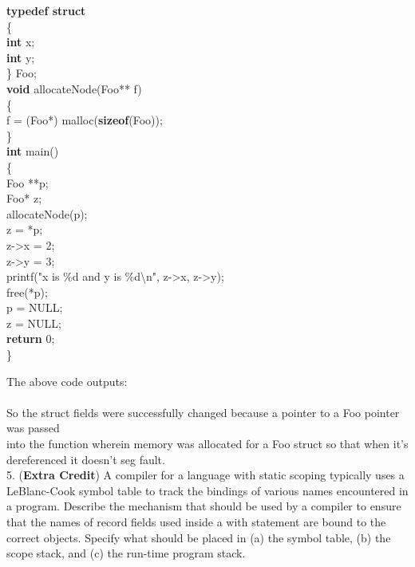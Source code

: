 \documentclass[12pt]{article}
\begin{document}
\begin{flushleft}
{\selectfont 

\qquad \qquad \textbf{typedef struct}\\ 
\qquad \qquad \{\\
\qquad \qquad \qquad \textbf{int} x;\\
\qquad \qquad \qquad \textbf{int} y;\\
\qquad \qquad \} Foo;\\
[2mm]
\qquad \qquad \textbf{void} allocateNode(Foo** f)\\
\qquad \qquad \{\\
\qquad \qquad \qquad *f = (Foo*) malloc(\textbf{sizeof}(Foo));\\
\qquad \qquad \}\\
[2mm]
\qquad \qquad \textbf{int} main()\\
\qquad \qquad \{\\
\qquad \qquad \qquad Foo **p;\\
\qquad \qquad \qquad Foo* z;\\
[2mm]	
\qquad \qquad \qquad allocateNode(p);\\
[2mm]
\qquad \qquad \qquad z = *p;\\
\qquad \qquad \qquad z->x = 2;\\
\qquad \qquad \qquad z->y = 3;\\
[2mm]	
\qquad \qquad \qquad printf("x is \%d and y is \%d\textbackslash n", z->x, z->y);\\
[2mm]	
\qquad \qquad \qquad free(*p);\\
\qquad \qquad \qquad p = NULL;\\	
\qquad \qquad \qquad z = NULL;\\
[2mm]
\qquad \qquad \qquad \textbf{return} 0;\\
\qquad \qquad \}\\[4mm]
	
}

\qquad \qquad The above code outputs:\\
[2mm]
\qquad \qquad {}\\
[2mm]
\qquad \qquad So the struct fields were successfully changed because a pointer to a {\selectfont Foo} pointer was passed\\
\qquad \qquad into the function wherein memory was allocated for a {\selectfont Foo} struct so that when it's\\
\qquad \qquad dereferenced it doesn't seg fault.\\
[10mm]

5. (\textbf{Extra Credit}) A compiler for a language with static scoping typically uses a LeBlanc-Cook symbol table to track the bindings of various names encountered in a program. Describe the mechanism that should be used by a compiler to ensure that the names of record fields used inside a with statement are bound to the correct objects. Specify what should be placed in (a) the symbol table, (b) the scope stack, and (c) the run-time program stack.\\
[2mm]




\end{flushleft}
\end{document}
